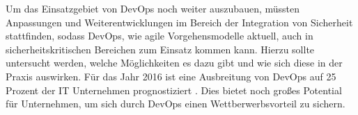 Um das Einsatzgebiet von DevOps noch weiter auszubauen, müssten Anpassungen und Weiterentwicklungen im Bereich der Integration von Sicherheit stattfinden, sodass DevOps, wie agile Vorgehensmodelle aktuell, auch in sicherheitskritischen Bereichen zum Einsatz kommen kann.
Hierzu sollte untersucht werden, welche Möglichkeiten es dazu gibt und wie sich diese in der Praxis auswirken.
Für das Jahr 2016 ist eine Ausbreitung von DevOps auf 25 Prozent der IT Unternehmen prognostiziert \parencite[vgl.][]{Gartner:2015}. 
Dies bietet noch großes Potential für Unternehmen, um sich durch DevOps einen Wettberwerbsvorteil zu sichern.

 